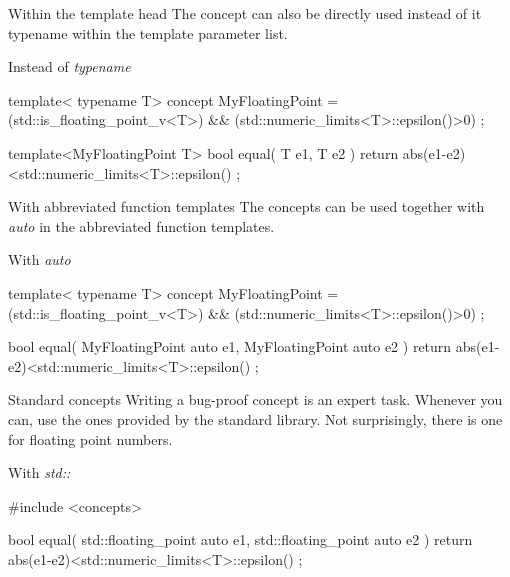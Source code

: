   \begin{frame}[fragile]
    \begin{block}{Within the template head}
        The concept can also be directly used instead of {it typename} within the template parameter list.
    \end{block}
    \begin{exampleblock}{Instead of {\it typename}}
      \scriptsize
      \begin{cppcode*}{}
      template< typename T>
      concept MyFloatingPoint =
        (std::is_floating_point_v<T>) &&
        (std::numeric_limits<T>::epsilon()>0) ;

      template<MyFloatingPoint T>
      bool equal( T e1, T e2 )
      { return abs(e1-e2)<std::numeric_limits<T>::epsilon() ; }
      \end{cppcode*}
    \end{exampleblock}
  \end{frame}

  \begin{frame}[fragile]
    \begin{block}{With abbreviated function templates}
        The concepts can be used together with {\it auto} in the abbreviated function templates.
    \end{block}
    \begin{exampleblock}{With {\it auto}}
      \scriptsize
      \begin{cppcode*}{}
      template< typename T>
      concept MyFloatingPoint =
        (std::is_floating_point_v<T>) &&
        (std::numeric_limits<T>::epsilon()>0) ;

      bool equal( MyFloatingPoint auto e1, MyFloatingPoint auto e2 )
      { return abs(e1-e2)<std::numeric_limits<T>::epsilon() ; }
      \end{cppcode*}
    \end{exampleblock}
  \end{frame}

  \begin{frame}[fragile]
    \begin{block}{Standard concepts}
        Writing a bug-proof concept is an expert task.
        Whenever you can, use the ones provided by the standard library.
        Not surprisingly, there is one for floating point numbers.
    \end{block}
    \begin{exampleblock}{With {\it std::}}
      \scriptsize
      \begin{cppcode*}{}
      #include <concepts>

      bool equal( std::floating_point auto e1, std::floating_point auto e2 )
      { return abs(e1-e2)<std::numeric_limits<T>::epsilon() ; }
      \end{cppcode*}
    \end{exampleblock}
  \end{frame}

